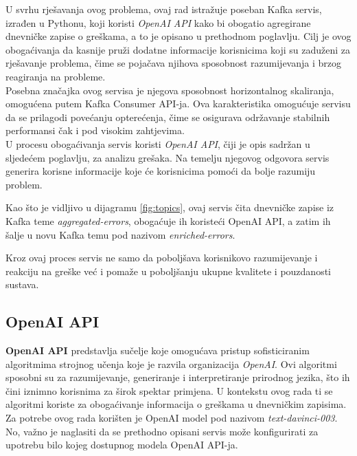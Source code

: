 \documentclass[times, utf8, diplomski]{fer}
\begin{document}
U svrhu rješavanja ovog problema, ovaj rad istražuje poseban Kafka servis, izrađen u Pythonu, koji koristi \emph{OpenAI API} kako bi obogatio agregirane dnevničke zapise o greškama, a to je opisano u prethodnom poglavlju. Cilj je ovog obogaćivanja da kasnije pruži dodatne informacije korisnicima koji su zaduženi za rješavanje problema, čime se pojačava njihova sposobnost razumijevanja i brzog reagiranja na probleme.\\

Posebna značajka ovog servisa je njegova sposobnost horizontalnog skaliranja, omogućena putem Kafka Consumer API-ja. Ova karakteristika omogućuje servisu da se prilagodi povećanju opterećenja, čime se osigurava održavanje stabilnih performansi čak i pod visokim zahtjevima.\\

U procesu obogaćivanja servis koristi \emph{OpenAI API}, čiji je opis sadržan u sljedećem poglavlju, za analizu grešaka. Na temelju njegovog odgovora servis generira korisne informacije koje će korisnicima pomoći da bolje razumiju problem.

Kao što je vidljivo u dijagramu \ref{fig:topics}, ovaj servis čita dnevničke zapise iz Kafka teme \glqq \emph{aggregated-errors}\grqq, obogaćuje ih koristeći OpenAI API, a zatim ih šalje u novu Kafka temu pod nazivom \glqq \emph{enriched-errors}\grqq.

Kroz ovaj proces servis ne samo da poboljšava korisnikovo razumijevanje i reakciju na greške već i pomaže u poboljšanju ukupne kvalitete i pouzdanosti sustava.

\subsection{OpenAI API}
\label{sec:openai}

\textbf{OpenAI API} predstavlja sučelje koje omogućava pristup sofisticiranim algoritmima strojnog učenja koje je razvila organizacija \emph{OpenAI}. Ovi algoritmi sposobni su za razumijevanje, generiranje i interpretiranje prirodnog jezika, što ih čini iznimno korisnima za širok spektar primjena. U kontekstu ovog rada ti se algoritmi koriste za obogaćivanje informacija o greškama u dnevničkim zapisima.\\

Za potrebe ovog rada korišten je OpenAI model pod nazivom \emph{text-davinci-003}. No, važno je naglasiti da se prethodno opisani servis može konfigurirati za upotrebu bilo kojeg dostupnog modela OpenAI API-ja.
\end{document}

